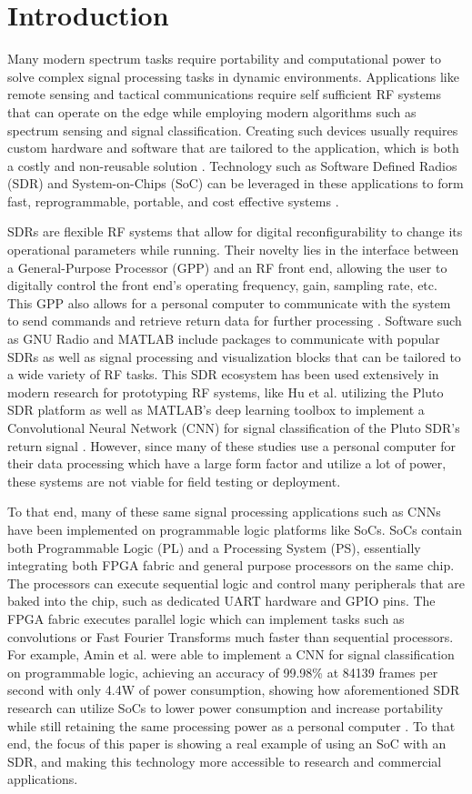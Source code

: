 \documentclass[conference]{IEEEtran}
\begin{document}
\section{Introduction}
Many modern spectrum tasks require portability and computational power to solve complex signal processing tasks in dynamic environments.
Applications like remote sensing and tactical communications require self sufficient RF systems that can operate on the edge while employing
modern algorithms such as spectrum sensing and signal classification. Creating such devices usually requires
custom hardware and software that are tailored to the application, which is both a costly and non-reusable solution \cite{10880410}. Technology such as
Software Defined Radios (SDR) and System-on-Chips (SoC) can be leveraged in these applications to form fast, reprogrammable, portable, and cost effective systems \cite{9721283}.

SDRs are flexible RF systems that allow for digital reconfigurability to change its operational parameters while running.
Their novelty lies in the interface between a General-Purpose Processor (GPP) and an RF front end, allowing the user to digitally control the front end's
operating frequency, gain, sampling rate, etc. This GPP also allows for a personal computer to communicate with the system to send commands and retrieve return
data for further processing \cite{9721283}. Software such as GNU Radio and MATLAB include packages to communicate with popular SDRs as well as signal processing and visualization
blocks that can be tailored to a wide variety of RF tasks. This SDR ecosystem has been used extensively in modern research for prototyping RF systems,
like Hu et al. utilizing the Pluto SDR platform as well as MATLAB's deep learning toolbox to implement a Convolutional Neural Network (CNN) 
for signal classification of the Pluto SDR's return signal \cite{9687958}. However, since many of these studies use a personal computer for their data processing which have a large form factor 
and utilize a lot of power, these systems are not viable for field testing or deployment. 

To that end, many of these same signal processing applications such as CNNs have been
implemented on programmable logic platforms like SoCs. SoCs contain both Programmable Logic (PL) and a Processing System (PS), essentially 
integrating both FPGA fabric and general purpose processors on the same chip. The processors can execute sequential logic and control
many peripherals that are baked into the chip, such as dedicated UART hardware and GPIO pins. The FPGA fabric executes
parallel logic which can implement tasks such as convolutions or Fast Fourier Transforms much faster than sequential processors.
For example, Amin et al. were able to implement a CNN for signal classification on programmable logic, achieving an accuracy of 99.98\% at 84139 
frames per second with only 4.4W of power consumption, showing how aforementioned SDR research can utilize
SoCs to lower power consumption and increase portability while still retaining the same processing power as a personal computer \cite{10794303}. 
To that end, the focus of this paper is showing a real example of using an SoC with an SDR, and making this technology more accessible to research and commercial applications.
\end{document}
